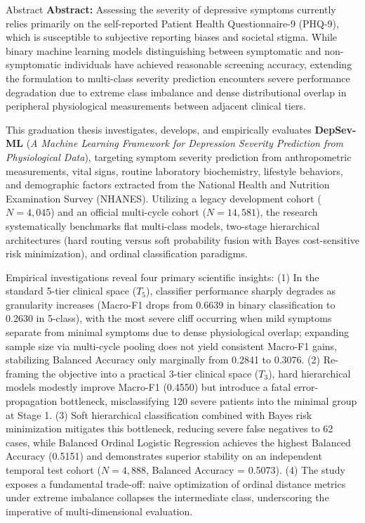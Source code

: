 \documentclass{uetgraduation}
\begin{document}
\begin{preamble}{Abstract}
\textbf{Abstract:} Assessing the severity of depressive symptoms currently relies primarily on the self-reported Patient Health Questionnaire-9 (PHQ-9), which is susceptible to subjective reporting biases and societal stigma. While binary machine learning models distinguishing between symptomatic and non-symptomatic individuals have achieved reasonable screening accuracy, extending the formulation to multi-class severity prediction encounters severe performance degradation due to extreme class imbalance and dense distributional overlap in peripheral physiological measurements between adjacent clinical tiers.

This graduation thesis investigates, develops, and empirically evaluates \textbf{DepSev-ML} (\textit{A Machine Learning Framework for Depression Severity Prediction from Physiological Data}), targeting symptom severity prediction from anthropometric measurements, vital signs, routine laboratory biochemistry, lifestyle behaviors, and demographic factors extracted from the National Health and Nutrition Examination Survey (NHANES). Utilizing a legacy development cohort ($N = 4,045$) and an official multi-cycle cohort ($N = 14,581$), the research systematically benchmarks flat multi-class models, two-stage hierarchical architectures (hard routing versus soft probability fusion with Bayes cost-sensitive risk minimization), and ordinal classification paradigms.

Empirical investigations reveal four primary scientific insights: (1) In the standard 5-tier clinical space ($T_5$), classifier performance sharply degrades as granularity increases (Macro-F1 drops from 0.6639 in binary classification to 0.2630 in 5-class), with the most severe cliff occurring when mild symptoms separate from minimal symptoms due to dense physiological overlap; expanding sample size via multi-cycle pooling does not yield consistent Macro-F1 gains, stabilizing Balanced Accuracy only marginally from 0.2841 to 0.3076. (2) Re-framing the objective into a practical 3-tier clinical space ($T_3$), hard hierarchical models modestly improve Macro-F1 (0.4550) but introduce a fatal error-propagation bottleneck, misclassifying 120 severe patients into the minimal group at Stage 1. (3) Soft hierarchical classification combined with Bayes risk minimization mitigates this bottleneck, reducing severe false negatives to 62 cases, while Balanced Ordinal Logistic Regression achieves the highest Balanced Accuracy (0.5151) and demonstrates superior stability on an independent temporal test cohort ($N = 4,888$, Balanced Accuracy = 0.5073). (4) The study exposes a fundamental trade-off: naive optimization of ordinal distance metrics under extreme imbalance collapses the intermediate class, underscoring the imperative of multi-dimensional evaluation.


\end{preamble}
\end{document}
